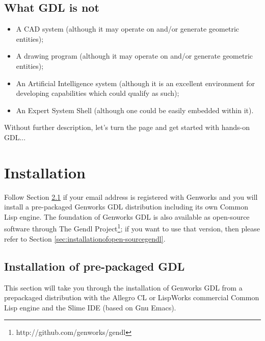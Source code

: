 \documentclass [11pt]{book}
\begin{document}
\section{What GDL is not}

\label{sec:whatgdlisnot}



\begin{itemize}

\item A CAD system (although it may operate on and/or generate geometric entities);

\item A drawing program (although it may operate on and/or generate geometric entities);

\item An Artificial Intelligence system (although it is an
excellent environment for developing capabilities which could qualify
as such);

\item An Expert System Shell (although one could be easily embedded within it).

\end{itemize}

Without further description, let's turn the page and get
      started with hands-on GDL...

\chapter{Installation}

\label{chap:installation}

Follow Section 
\ref{sec:installationofpre-packagedgdl} if your email address is registered with Genworks and you will
install a pre-packaged Genworks GDL distribution including its own
Common Lisp engine.  The foundation of Genworks GDL is also available
as open-source software through The Gendl Project\footnote{http://github.com/genworks/gendl}; if you want to use that version, then please refer to Section 
\ref{sec:installationofopen-sourcegendl}.

\section{Installation of pre-packaged GDL}

\label{sec:installationofpre-packagedgdl}

This section will take you through the installation of
Genworks GDL from a prepackaged distribution with the Allegro CL or
LispWorks commercial Common Lisp engine and the Slime IDE (based on
Gnu Emacs).
\end{document}
